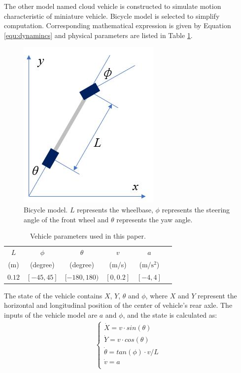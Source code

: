 \documentclass[conference]{IEEEtran}
\begin{document}
	The other model named cloud vehicle is constructed to simulate motion characteristic of miniature vehicle. Bicycle model is selected to simplify computation. Corresponding mathematical expression is given by Equation \ref{equ:dynamincs} and physical parameters are listed in Table \ref{tab:equationParas}.
	\begin{figure}[htbp]
	\begin{center}
		\includegraphics[scale = 0.5]{figure/bicyclemodel.png}
		\caption{Bicycle model. $L$ represents the wheelbase, $\phi$ represents the steering angle of the front wheel and $\theta$ represents the yaw angle. }
		\label{fig_bicyclemodel}
	\end{center}
	\end{figure}
	\begin{table}[htbp]
	\centering
	\caption {Vehicle parameters used in this paper.}
	\label {tab:equationParas}
	\begin{tabular}{|c|c|c|c|c|c|}
		\hline
		$L$ & $\phi$ & $\theta$ & $v$ & $a$ \\
		(m) & (degree) & (degree) & (m/s) & (m/$\text{s}^2$) \\
		\hline
		$0.12$ & $[-45,45]$ & $[-180,180)$ & $[0,0.2]$ & $[-4,4]$ \\
		\hline
	\end{tabular}
	\end{table}
	The state of the vehicle contains $X$, $Y$, $\theta$ and $\phi$, where $X$ and $Y$ represent the horizontal and longitudinal position of the center of vehicle's rear axle. The inputs of the vehicle model are $a$ and $\phi$, and the state is calculated as:
	\begin{eqnarray}
	\begin{cases}
		\label{equ:dynamincs}
		\dot{X}=v\cdot sin(\theta)\\
		\dot{Y}=v\cdot cos(\theta)\\
		\dot{\theta}=tan(\phi)\cdot v/L\\
		\dot{v}=a\\
	\end{cases}
	\end{eqnarray}
	
\end{document}
